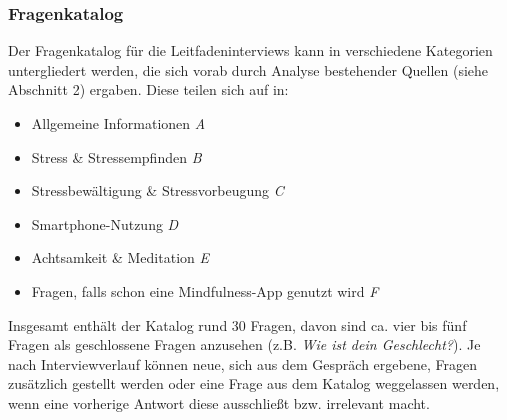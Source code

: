 \documentclass[10pt]{article}
\begin{document}
\subsubsection{Fragenkatalog}
Der Fragenkatalog für die Leitfadeninterviews kann in verschiedene Kategorien untergliedert werden, die sich vorab durch Analyse bestehender Quellen (siehe Abschnitt 2) ergaben. Diese teilen sich auf in: 
\begin{itemize}[itemsep=0.5mm, parsep=0pt]
\item  Allgemeine Informationen \textit{A}
\item  Stress \& Stressempfinden \textit{B}
\item  Stressbewältigung \& Stressvorbeugung \textit{C}
\item  Smartphone-Nutzung \textit{D}
\item  Achtsamkeit \& Meditation \textit{E}
\item  Fragen, falls schon eine Mindfulness-App genutzt wird \textit{F}
\end{itemize}

Insgesamt enthält der Katalog rund 30 Fragen, davon sind ca. vier bis fünf Fragen als geschlossene Fragen anzusehen (z.B. \textit{Wie ist dein Geschlecht?}). Je nach Interviewverlauf können neue, sich aus dem Gespräch ergebene, Fragen zusätzlich gestellt werden oder eine Frage aus dem Katalog weggelassen werden, wenn eine vorherige Antwort diese ausschließt bzw. irrelevant macht.
\end{document}
